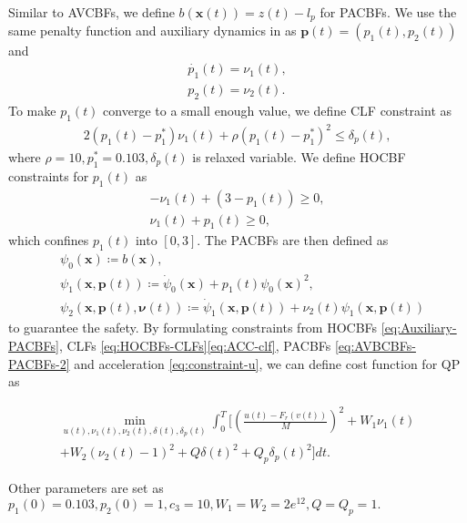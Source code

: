 Similar to AVCBFs, we define $b(\boldsymbol{x}(t))=z(t)-l_{p}$ for PACBFs. We use the same penalty function and auxiliary dynamics in \cite{xiao2021adaptive} as $\boldsymbol{p}(t)=(p_{1}(t), p_{2}(t))$ and
\begin{equation}
\label{eq:AVBCBFs-PACBFs-1}
\begin{split}
\dot{p_{1}}(t)=\nu_{1}(t),\\
p_{2}(t)=\nu_{2}(t).
\end{split}
\end{equation}
To make $p_{1}(t)$ converge to a small enough value, we define CLF constraint as
\begin{equation}
\label{eq:HOCBFs-CLFs}
\begin{split}
2(p_{1}(t)-p_{1}^{\ast })\nu_{1}(t)+\rho (p_{1}(t)-p_{1}^{\ast})^{2}\le \delta_{p}(t),
\end{split}
\end{equation}
where $\rho=10, p_{1}^{\ast}=0.103, \delta_{p}(t)$ is relaxed variable. We define HOCBF constraints for $p_{1}(t)$ as 
\begin{equation}
\label{eq:Auxiliary-PACBFs}
\begin{split}
-\nu_{1}(t)+(3-p_{1}(t))\ge0,\\
\nu_{1}(t)+p_{1}(t)\ge0,
\end{split}
\end{equation}
which confines $p_{1}(t)$ into $[0,3].$ The PACBFs are then defined as 
\begin{equation}
\label{eq:AVBCBFs-PACBFs-2}
\begin{split}
&\psi_{0}(\boldsymbol{x})\coloneqq b(\boldsymbol{x}),\\
&\psi_{1}(\boldsymbol{x},\boldsymbol{p}(t))\coloneqq \dot{\psi}_{0}(\boldsymbol{x})+p_{1}(t)\psi_{0}(\boldsymbol{x})^{2},\\
&\psi_{2}(\boldsymbol{x},\boldsymbol{p}(t),\boldsymbol{\nu}(t))\coloneqq \dot{\psi}_{1}(\boldsymbol{x},\boldsymbol{p}(t))+\nu_{2}(t)\psi_{1}(\boldsymbol{x},\boldsymbol{p}(t))
\end{split}
\end{equation}
to guarantee the safety. By formulating constraints from HOCBFs \eqref{eq:Auxiliary-PACBFs}, CLFs \eqref{eq:HOCBFs-CLFs}\eqref{eq:ACC-clf}, PACBFs \eqref{eq:AVBCBFs-PACBFs-2} and acceleration \eqref{eq:constraint-u}, we can define cost function 
 for QP as
 \begin{small}
\begin{equation}
\label{eq:PACBF-cost}
\begin{split}
\min_{u(t),\nu_{1}(t),\nu_{2}(t),\delta(t),\delta_{p}(t)} \int_{0}^{T}[(\frac{u(t)-F_{r}(v(t))}{M})^{2}+W_{1}\nu_{1}(t)\\+W_{2}(\nu_{2}(t)-1)^{2}+Q\delta(t)^{2}+Q_{p}\delta_{p}(t)^{2}]dt. 
\end{split}
\end{equation}
\end{small}
Other parameters are set as $p_{1}(0)=0.103, p_{2}(0)=1, c_{3}=10, W_{1}=W_{2}=2e^{12},Q=Q_{p}=1.$
